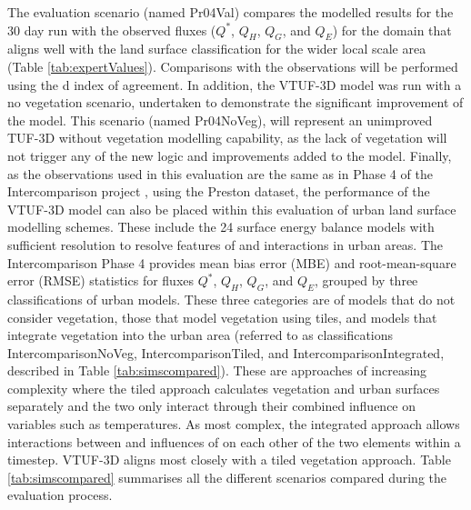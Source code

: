 \documentclass[final,3p,times,authoryear]{elsarticle}
\begin{document}
The evaluation scenario (named Pr04Val) compares the modelled results for the 30 day run with the observed fluxes ($Q^{*}$, $Q_{H}$, $Q_{G}$, and $Q_{E}$) for the domain that aligns well with the land surface classification for the wider local scale area (Table \ref{tab:expertValues}). Comparisons with the observations will be performed using the \cite{Willmott1981} d index of agreement. In addition, the VTUF-3D model was run with a no vegetation scenario, undertaken to demonstrate the significant improvement of the model. This scenario (named Pr04NoVeg), will represent an unimproved TUF-3D without vegetation modelling capability, as the lack of vegetation will not trigger any of the new logic and improvements added to the model. Finally, as the observations used in this evaluation are the same as in Phase 4 of the Intercomparison project \citep{Best2012}, using the \cite{Coutts2007} Preston dataset, the performance of the VTUF-3D model can also be placed within this evaluation of urban land surface modelling schemes. These include the 24 surface energy balance models with sufficient resolution to resolve features of and interactions in urban areas. The Intercomparison Phase 4 provides mean bias error (MBE) and root-mean-square error (RMSE) statistics for fluxes $Q^{*}$, $Q_{H}$, $Q_{G}$, and $Q_{E}$, grouped by three classifications of urban models. These three categories are of models that do not consider vegetation, those that model vegetation using tiles, and models that integrate vegetation into the urban area (referred to as classifications IntercomparisonNoVeg, IntercomparisonTiled, and IntercomparisonIntegrated, described in Table \ref{tab:simscompared}). These are approaches of increasing complexity where the tiled approach calculates vegetation and urban surfaces separately and the two only interact through their combined influence on variables such as temperatures. As most complex, the integrated approach allows interactions between and influences of on each other of the two elements within a timestep. VTUF-3D aligns most closely with a tiled vegetation approach. Table \ref{tab:simscompared} summarises all the different scenarios compared during the evaluation process.
\end{document}
